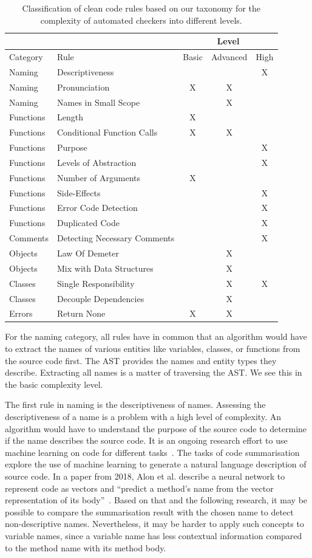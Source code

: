 \begin{table}[h]
\begin{tabularx}{\textwidth}{XXccc}
\toprule
&     & \multicolumn{3}{c}{Level} \\ \midrule
Category&Rule & Basic  & Advanced  & High \\ \midrule
Naming&Descriptiveness&&& X\\
Naming&Pronunciation&X&X& \\
Naming&Names in Small Scope&&X& \\
Functions&Length&X&&\\
Functions&Conditional Function Calls&X&X& \\
Functions&Purpose&&&X\\
Functions&Levels of Abstraction&&&X\\
Functions&Number of Arguments&X&& \\
Functions&Side-Effects&&&X\\
Functions&Error Code Detection&&&X \\
Functions&Duplicated Code&&&X \\
Comments&Detecting Necessary Comments&&&X \\
Objects&Law Of Demeter&&X& \\
Objects&Mix with Data Structures&&X& \\
Classes&Single Responsibility&&X&X \\
Classes&Decouple Dependencies&&X& \\
Errors&Return None&X&X& \\
\bottomrule
\end{tabularx}
\caption{Classification of clean code rules based on our taxonomy for the complexity of automated checkers into different levels.}
\label{tab:complexity_level_overview}
\end{table}


For the naming category, all rules have in common that an algorithm would have to extract the names of various entities like variables, classes, or functions from the source code first. The AST provides the names and entity types they describe. Extracting all names is a matter of traversing the AST. We see this in the basic complexity level.

The first rule in naming is the descriptiveness of names. Assessing the descriptiveness of a name is a problem with a high level of complexity. An algorithm would have to understand the purpose of the source code to determine if the name describes the source code. It is an ongoing research effort to use machine learning on code for different tasks~\cite{allamanis_survey_2018}. The tasks of code summarisation explore the use of machine learning to generate a natural language description of source code. In a paper from 2018, Alon et al. describe a neural network to represent code as vectors and \enquote{predict a method’s name from the vector representation of its body}~\cite{alon_code2vec_2018}. Based on that and the following research, it may be possible to compare the summarisation result with the chosen name to detect non-descriptive names. Nevertheless, it may be harder to apply such concepts to variable names, since a variable name has less contextual information compared to the method name with its method body.

